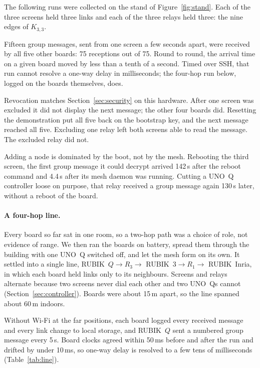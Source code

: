 \documentclass[conference,10pt]{IEEEtran}
\begin{document}
The following runs were collected on the stand of
Figure~\ref{fig:stand}. Each of the three screens held three links and
each of the three relays held three: the nine edges of $K_{3,3}$.

Fifteen group messages, sent from one screen a few seconds apart, were
received by all five other boards: 75 receptions out of 75. Round to
round, the arrival time on a given board moved by less than a tenth of a
second. Timed over SSH, that run cannot resolve a one-way delay in
milliseconds; the four-hop run below, logged on the boards themselves,
does.

Revocation matches Section~\ref{sec:security} on this hardware. After one
screen was excluded it did not display the next message; the other four
boards did. Resetting the demonstration put all five back on the
bootstrap key, and the next message reached all five. Excluding one
relay left both screens able to read the message. The excluded relay did
not.

Adding a node is dominated by the boot, not by the mesh. Rebooting the
third screen, the first group message it could decrypt arrived 142\,s
after the reboot command and 4.4\,s after its mesh daemon was running.
Cutting a UNO~Q controller loose on purpose, that relay received a group
message again 130\,s later, without a reboot of the board.

\paragraph{A four-hop line.}
Every board so far sat in one room, so a two-hop path was a choice of
role, not evidence of range. We then ran the boards on battery, spread
them through the building with one UNO~Q switched off, and let the mesh
form on its own. It settled into a single line,
RUBIK~$Q \to R_3 \to$ RUBIK~$3 \to R_1 \to$ RUBIK~Inria, in which each
board held links only to its neighbours. Screens and relays alternate
because two screens never dial each other and two UNO~Qs cannot
(Section~\ref{sec:controller}). Boards were about 15\,m apart, so the
line spanned about 60\,m indoors.

Without Wi-Fi at the far positions, each board logged every received
message and every link change to local storage, and RUBIK~$Q$ sent a
numbered group message every 5\,s. Board clocks agreed within 50\,ms
before and after the run and drifted by under 10\,ms, so one-way delay
is resolved to a few tens of milliseconds (Table~\ref{tab:line}).
\end{document}
